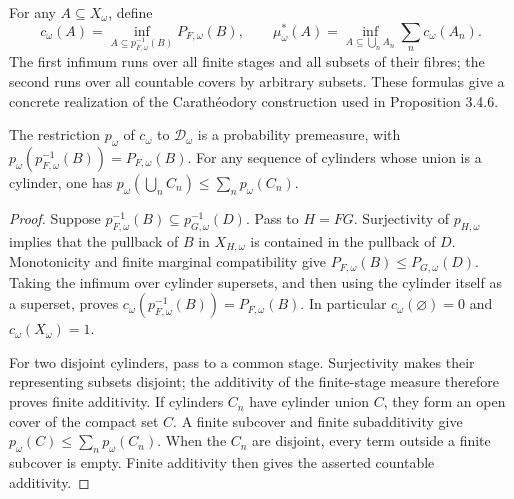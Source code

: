 \begin{definition}\label{def:cylinder-content}
\leanok
{}
For any $A\subseteq X_\omega$, define
\[
 c_\omega(A)=\inf_{A\subseteq p_{F,\omega}^{-1}(B)}P_{F,\omega}(B),
 \qquad
 \mu_\omega^*(A)=\inf_{A\subseteq\bigcup_n A_n}\sum_n c_\omega(A_n).
\]
The first infimum runs over all finite stages and all subsets of their
fibres; the second runs over all countable covers by arbitrary subsets.
These formulas give a concrete realization of the Carath\'eodory
construction used in Proposition 3.4.6.
\end{definition}

\begin{lemma}\label{lem:cylinder-premeasure}
\leanok
{}
The restriction $p_\omega$ of $c_\omega$ to $\mathcal D_\omega$ is a
probability premeasure, with
$p_\omega(p_{F,\omega}^{-1}(B))=P_{F,\omega}(B)$.
For any sequence of cylinders whose union is a cylinder, one has
$p_\omega(\bigcup_n C_n)\leq\sum_n p_\omega(C_n)$.
\end{lemma}
\begin{proof}
Suppose $p_{F,\omega}^{-1}(B)\subseteq p_{G,\omega}^{-1}(D)$.
Pass to $H=FG$. Surjectivity of $p_{H,\omega}$ implies that the
pullback of $B$ in $X_{H,\omega}$ is contained in the pullback of $D$.
Monotonicity and finite marginal compatibility give
$P_{F,\omega}(B)\leq P_{G,\omega}(D)$. Taking the infimum over
cylinder supersets, and then using the cylinder itself as a superset,
proves $c_\omega(p_{F,\omega}^{-1}(B))=P_{F,\omega}(B)$.
In particular $c_\omega(\varnothing)=0$ and
$c_\omega(X_\omega)=1$.

For two disjoint cylinders, pass to a common stage. Surjectivity makes
their representing subsets disjoint; the additivity of the finite-stage
measure therefore proves finite additivity. If cylinders $C_n$ have
cylinder union $C$, they form an open cover of the compact set $C$.
A finite subcover and finite subadditivity give
$p_\omega(C)\leq\sum_n p_\omega(C_n)$.
When the $C_n$ are disjoint, every term outside a finite subcover is
empty. Finite additivity then gives the asserted countable additivity.
\end{proof}

